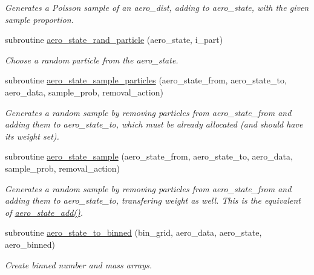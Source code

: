 \begin{DoxyCompactItemize}
\begin{DoxyCompactList}\small\item\em Generates a Poisson sample of an {\ttfamily aero\+\_\+dist}, adding to {\ttfamily aero\+\_\+state}, with the given sample proportion. \end{DoxyCompactList}\item 
subroutine \mbox{\hyperlink{namespacepmc__aero__state_ab4369f9cfc8e1fdc80c6cd2aced773c9}{aero\+\_\+state\+\_\+rand\+\_\+particle}} (aero\+\_\+state, i\+\_\+part)
\begin{DoxyCompactList}\small\item\em Choose a random particle from the aero\+\_\+state. \end{DoxyCompactList}\item 
subroutine \mbox{\hyperlink{namespacepmc__aero__state_a45e47d79732741df0dacf15d65d7b4a7}{aero\+\_\+state\+\_\+sample\+\_\+particles}} (aero\+\_\+state\+\_\+from, aero\+\_\+state\+\_\+to, aero\+\_\+data, sample\+\_\+prob, removal\+\_\+action)
\begin{DoxyCompactList}\small\item\em Generates a random sample by removing particles from aero\+\_\+state\+\_\+from and adding them to aero\+\_\+state\+\_\+to, which must be already allocated (and should have its weight set). \end{DoxyCompactList}\item 
subroutine \mbox{\hyperlink{namespacepmc__aero__state_a1ccf923e3212b8800371ebd59156ff8f}{aero\+\_\+state\+\_\+sample}} (aero\+\_\+state\+\_\+from, aero\+\_\+state\+\_\+to, aero\+\_\+data, sample\+\_\+prob, removal\+\_\+action)
\begin{DoxyCompactList}\small\item\em Generates a random sample by removing particles from aero\+\_\+state\+\_\+from and adding them to aero\+\_\+state\+\_\+to, transfering weight as well. This is the equivalent of \mbox{\hyperlink{namespacepmc__aero__state_ad9c12bba90caa58b86882ebfe4a4335c}{aero\+\_\+state\+\_\+add()}}. \end{DoxyCompactList}\item 
subroutine \mbox{\hyperlink{namespacepmc__aero__state_a5535ba7076130a468b1b71a36b64e408}{aero\+\_\+state\+\_\+to\+\_\+binned}} (bin\+\_\+grid, aero\+\_\+data, aero\+\_\+state, aero\+\_\+binned)
\begin{DoxyCompactList}\small\item\em Create binned number and mass arrays. \end{DoxyCompactList}\item 

\end{DoxyCompactItemize}
